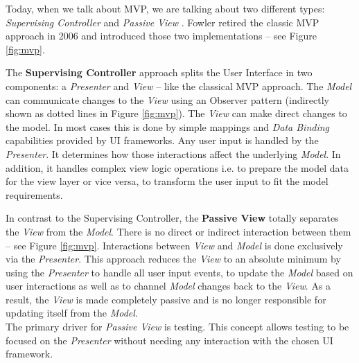 Today, when we talk about MVP, we are talking about two different types: \emph{Supervising Controller} \cite{FowlerSupervisingController} and \emph{Passive View} \cite{FowlerPassiveView}. Fowler retired the classic MVP approach in 2006 \cite{FowlerMvpRetirementNote} and introduced those two implementations -- see Figure \ref{fig:mvp}.

The \textbf{Supervising Controller} approach splits the User Interface in two components: a \emph{Presenter} and \emph{View} – like the classical MVP approach. The \emph{Model} can communicate changes to the \emph{View} using an Observer pattern (indirectly shown as dotted lines in Figure \ref{fig:mvp}). The \emph{View} can make direct changes to the model. In most cases this is done by simple mappings and \emph{Data Binding} capabilities provided by UI frameworks. Any user input is handled by the \emph{Presenter}. It determines how those interactions affect the underlying \emph{Model}. In addition, it handles complex view logic operations i.e. to prepare the model data for the view layer or vice versa, to transform the user input to fit the model requirements.

In contrast to the Supervising Controller, the \textbf{Passive View} totally separates the \emph{View} from the \emph{Model}. There is no direct or indirect interaction between them -- see Figure \ref{fig:mvp}. Interactions between \emph{View} and \emph{Model} is done exclusively via the \emph{Presenter}. This approach reduces the \emph{View} to an absolute minimum by using the \emph{Presenter} to handle all user input events, to update the \emph{Model} based on user interactions as well as to channel \emph{Model} changes back to the \emph{View}. As a result, the \emph{View} is made completely passive and is no longer responsible for updating itself from the \emph{Model}.\\
The primary driver for \emph{Passive View} is testing. This concept allows testing to be focused on the \emph{Presenter} without needing any interaction with the chosen UI framework.

